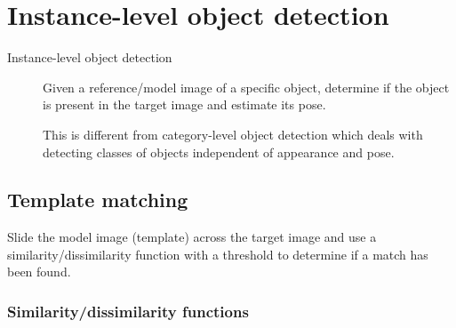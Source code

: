 \chapter{Instance-level object detection}


\begin{description}
    \item[Instance-level object detection] 
        Given a reference/model image of a specific object,
        determine if the object is present in the target image and estimate its pose.

        \begin{remark}
            This is different from category-level object detection which deals with detecting classes of objects
            independent of appearance and pose.
        \end{remark}
\end{description}



\section{Template matching}

Slide the model image (template) across the target image and 
use a similarity/dissimilarity function with a threshold to determine if a match has been found.


\subsection{Similarity/dissimilarity functions}

